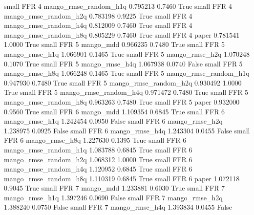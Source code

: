      small      FFR                 4 mango_rmse_random_h1q   0.795213      0.7460    True
     small      FFR                 4 mango_rmse_random_h2q   0.783198      0.9225    True
     small      FFR                 4 mango_rmse_random_h4q   0.812009      0.7460    True
     small      FFR                 4 mango_rmse_random_h8q   0.805229      0.7460    True
     small      FFR                 4                 paper   0.781541      1.0000    True
     small      FFR                 5             mango_mdd   0.966235      0.7480    True
     small      FFR                 5        mango_rmse_h1q   1.066901      0.1465    True
     small      FFR                 5        mango_rmse_h2q   1.070248      0.1070    True
     small      FFR                 5        mango_rmse_h4q   1.067938      0.0740   False
     small      FFR                 5        mango_rmse_h8q   1.066248      0.1465    True
     small      FFR                 5 mango_rmse_random_h1q   0.947930      0.7480    True
     small      FFR                 5 mango_rmse_random_h2q   0.930492      1.0000    True
     small      FFR                 5 mango_rmse_random_h4q   0.971472      0.7480    True
     small      FFR                 5 mango_rmse_random_h8q   0.963263      0.7480    True
     small      FFR                 5                 paper   0.932000      0.9560    True
     small      FFR                 6             mango_mdd   1.109354      0.6845    True
     small      FFR                 6        mango_rmse_h1q   1.242454      0.0950   False
     small      FFR                 6        mango_rmse_h2q   1.238975      0.0925   False
     small      FFR                 6        mango_rmse_h4q   1.243304      0.0455   False
     small      FFR                 6        mango_rmse_h8q   1.227630      0.1395    True
     small      FFR                 6 mango_rmse_random_h1q   1.083788      0.6845    True
     small      FFR                 6 mango_rmse_random_h2q   1.068312      1.0000    True
     small      FFR                 6 mango_rmse_random_h4q   1.120952      0.6845    True
     small      FFR                 6 mango_rmse_random_h8q   1.110319      0.6845    True
     small      FFR                 6                 paper   1.072118      0.9045    True
     small      FFR                 7             mango_mdd   1.233881      0.6030    True
     small      FFR                 7        mango_rmse_h1q   1.397246      0.0690   False
     small      FFR                 7        mango_rmse_h2q   1.388240      0.0750   False
     small      FFR                 7        mango_rmse_h4q   1.393834      0.0455   False
